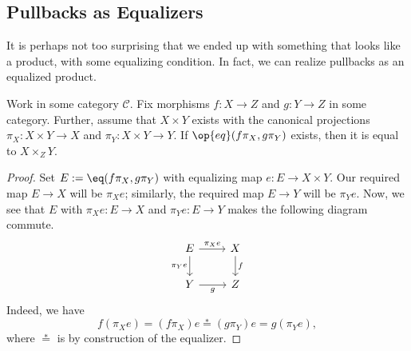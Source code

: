 \subsection{Pullbacks as Equalizers}
It is perhaps not too surprising that we ended up with something that looks like a product, with some equalizing condition. In fact, we can realize pullbacks as an equalized product.
\begin{proposition}
	Work in some category $\mathcal C$. Fix morphisms $f:X\to Z$ and $g:Y\to Z$ in some category. Further, assume that $X\times Y$ exists with the canonical projections $\pi_X:X\times Y\to X$ and $\pi_Y:X\times Y\to Y$. If $\op{eq}(f\pi_X,g\pi_Y)$ exists, then it is equal to $X\times_ZY$.
\end{proposition}
\begin{proof}
	Set $E:=\eq(f\pi_X,g\pi_Y)$ with equalizing map $e:E\to X\times Y$. Our required map $E\to X$ will be $\pi_Xe$; similarly, the required map $E\to Y$ will be $\pi_Ye$. Now, we see that $E$ with $\pi_Xe:E\to X$ and $\pi_Ye:E\to Y$ makes the following diagram commute.
	\[\begin{tikzcd}
		E & X \\
		Y & Z
		\arrow["f", from=1-2, to=2-2]
		\arrow["g"', from=2-1, to=2-2]
		\arrow["{\pi_Xe}", from=1-1, to=1-2]
		\arrow["{\pi_Ye}"', from=1-1, to=2-1]
	\end{tikzcd}\]
	Indeed, we have
	\[f(\pi_Xe)=(f\pi_X)e\stackrel*=(g\pi_Y)e=g(\pi_Ye),\]
	where $\stackrel*=$ is by construction of the equalizer.


\end{proof}
